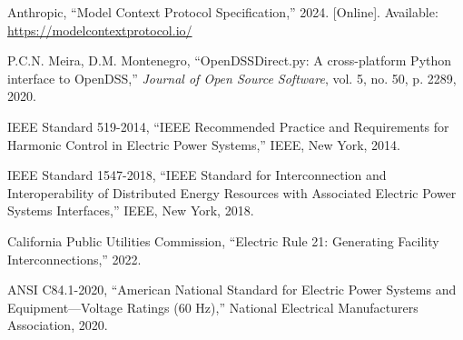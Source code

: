 \documentclass[review]{elsarticle}
\begin{document}
\begin{thebibliography}{99}
Anthropic,
``Model Context Protocol Specification,'' 2024. [Online].
Available: \url{https://modelcontextprotocol.io/}

P.C.N. Meira, D.M. Montenegro,
``OpenDSSDirect.py: A cross-platform Python interface to OpenDSS,''
\textit{Journal of Open Source Software}, vol. 5, no. 50, p. 2289, 2020.

IEEE Standard 519-2014,
``IEEE Recommended Practice and Requirements for Harmonic Control in Electric Power Systems,''
IEEE, New York, 2014.

IEEE Standard 1547-2018,
``IEEE Standard for Interconnection and Interoperability of Distributed Energy Resources with Associated Electric Power Systems Interfaces,''
IEEE, New York, 2018.

California Public Utilities Commission,
``Electric Rule 21: Generating Facility Interconnections,'' 2022.

ANSI C84.1-2020,
``American National Standard for Electric Power Systems and Equipment—Voltage Ratings (60 Hz),''
National Electrical Manufacturers Association, 2020.

\end{thebibliography}
\end{document}
